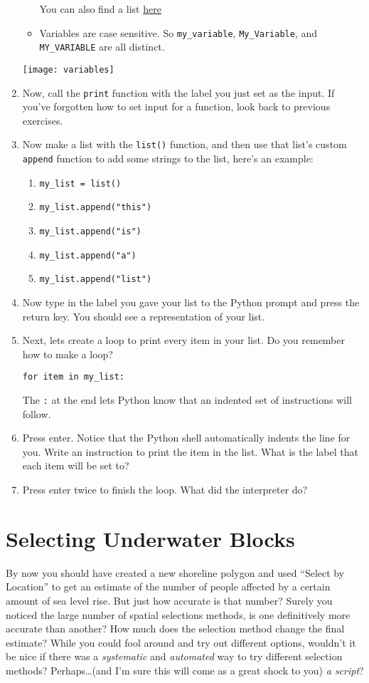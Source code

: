 \documentclass{article}
\begin{document}
\begin{enumerate}
\begin{itemize}
            You can also find a list \href{https://docs.python.org/2/reference/lexical_analysis.html#keywords}{here}
        \item Variables are case sensitive.  So \texttt{my\_variable}, \texttt{My\_Variable}, and \texttt{MY\_VARIABLE} are all distinct.
    \end{itemize}

    \texttt{[image: variables]}
    \item Now, call the \texttt{print} function with the label you just set as the input.  If you've forgotten how to set input for a function, look back to previous exercises.
    \item Now make a list with the \texttt{list()} function, and then use that list's custom \texttt{append} function to add some strings to the list, here's an example:
    \begin{enumerate}
        \item \texttt{my\_list = list()} 
        \item \texttt{my\_list.append("this")}
        \item \texttt{my\_list.append("is")}
        \item \texttt{my\_list.append("a")} 
        \item \texttt{my\_list.append("list")}
    \end{enumerate}

    \item Now type in the label you gave your list to the Python prompt and press the return key.  You should see a representation of your list.
    \item Next, lets create a loop to print every item in your list.  Do you remember how to make a loop?

        \texttt{for item in my\_list:}
    
        The \texttt{:} at the end lets Python know that an indented set of instructions will follow.
    \item Press enter.  Notice that the Python shell automatically indents the line for you.  Write an instruction to print the item in the list.  What is the label that each item will be set to?
    \item Press enter twice to finish the loop.  What did the interpreter do?\end{enumerate}

\section{Selecting Underwater Blocks}
By now you should have created a new shoreline polygon and used ``Select by Location'' to get an estimate of the number of people affected by a certain amount of sea level rise.  But just how accurate is that number?  Surely you noticed the large number of spatial selections methods, is one definitively more accurate than another?  How much does the selection method change the final estimate?  While you could fool around and try out different options, wouldn't it be nice if there was a \textit{systematic} and \textit{automated} way to try different selection methods?  Perhaps\ldots(and I'm sure this will come as a great shock to you) \textit{a script}?
\end{document}
